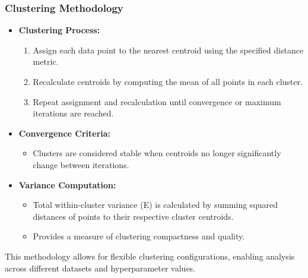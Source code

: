 \subsubsection{Clustering Methodology}
\begin{itemize}
    \item \textbf{Clustering Process:}
    \begin{enumerate}
        \item Assign each data point to the nearest centroid using the specified distance metric.
        \item Recalculate centroids by computing the mean of all points in each cluster.
        \item Repeat assignment and recalculation until convergence or maximum iterations are reached.
    \end{enumerate}
        \item \textbf{Convergence Criteria:} 
    \begin{itemize}
        \item Clusters are considered stable when centroids no longer significantly change between iterations.
    \end{itemize}

    \item \textbf{Variance Computation:}
    \begin{itemize}
        \item Total within-cluster variance (E) is calculated by summing squared distances of points to their respective cluster centroids.
        \item Provides a measure of clustering compactness and quality.
    \end{itemize}
\end{itemize}
This methodology allows for flexible clustering configurations, enabling analysis across different datasets and hyperparameter values.
